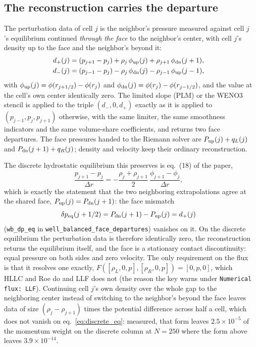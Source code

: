 \documentclass[english,a4paper]{my_memo}
\begin{document}
\subsection{The reconstruction carries the departure}

The perturbation data of cell $j$ is the neighbor's pressure measured against
cell $j$'s equilibrium continued \emph{through the face} to the neighbor's
center, with cell $j$'s density up to the face and the neighbor's beyond it:
\begin{align}
  d_{+}(j) &= (p_{j+1} - p_j) + \rho_j\,\phi_{\rm up}(j) + \rho_{j+1}\,\phi_{\rm dn}(j+1), \\
  d_{-}(j) &= (p_{j-1} - p_j) - \rho_j\,\phi_{\rm dn}(j) - \rho_{j-1}\,\phi_{\rm up}(j-1),
\end{align}
with $\phi_{\rm up}(j) = \phi(r_{j+1/2}) - \phi(r_j)$ and
$\phi_{\rm dn}(j) = \phi(r_j) - \phi(r_{j-1/2})$, and the value at the cell's
own center identically zero. The limited slope (PLM) or the WENO3 stencil is
applied to the triple $(d_{-}, 0, d_{+})$ exactly as it is applied to
$(p_{j-1}, p_j, p_{j+1})$ otherwise, with the same limiter, the same smoothness
indicators and the same volume-share coefficients, and returns two face
departures. The face pressures handed to the Riemann solver are
$P_{\rm up}(j) + q_L(j)$ and $P_{\rm dn}(j+1) + q_R(j)$; density and velocity
keep their ordinary reconstruction.

The discrete hydrostatic equilibrium this preserves is eq.\ (18) of the paper,
\begin{equation}
  \frac{p_{j+1} - p_j}{\Delta r} = -\frac{\rho_j + \rho_{j+1}}{2}\,
  \frac{\phi_{j+1} - \phi_j}{\Delta r},
  \label{eq:discrete_eq}
\end{equation}
which is exactly the statement that the two neighboring extrapolations agree
at the shared face, $P_{\rm up}(j) = P_{\rm dn}(j+1)$: the face mismatch
\begin{equation}
  \delta p_{{\rm eq}}(j+1/2) = P_{\rm dn}(j+1) - P_{\rm up}(j) = d_{+}(j)
\end{equation}
(\texttt{wb\_dp\_eq} in \texttt{well\_balanced\_face\_departures}) vanishes on
it. On the discrete equilibrium the perturbation data is therefore
identically zero, the reconstruction returns the equilibrium itself, and the
face is a stationary contact discontinuity: equal pressure on both sides and
zero velocity. The only requirement on the flux is that it resolves one
exactly, $F([\rho_L, 0, p], [\rho_R, 0, p]) = [0, p, 0]$, which HLLC and Roe
do and LLF does not (the reason the key warns under \texttt{Numerical flux:\
LLF}). Continuing cell $j$'s own density over the whole gap to the neighboring
center instead of switching to the neighbor's beyond the face leaves data of
size $(\rho_j - \rho_{j+1})$ times the potential difference across half a
cell, which does not vanish on eq.\ \eqref{eq:discrete_eq}: measured, that
form leaves $2.5\times10^{-5}$ of the momentum weight on the discrete column
at $N = 250$ where the form above leaves $3.9\times10^{-14}$.
\end{document}
